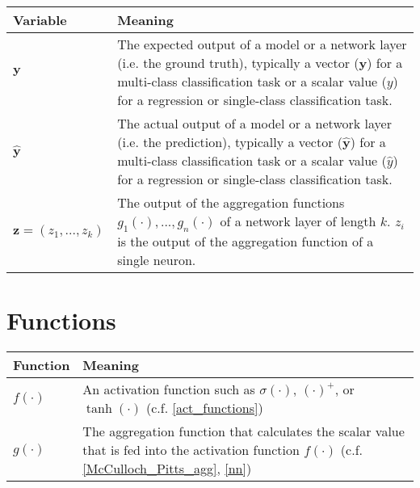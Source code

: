  \begin{tabular}{ p{3cm} p{11cm} }
	\textbf{Variable} & \textbf{Meaning}\\
	\hline
     $\boldsymbol{y}$ & The expected output of a model or a network layer (i.e. the ground truth), typically a vector ($\boldsymbol{y}$) for a multi-class classification task or a scalar value ($y$) for a regression or single-class classification task.\\
 	$\boldsymbol{\hat{y}}$ & The actual output of a model or a network layer (i.e. the prediction), typically a vector ($\boldsymbol{\hat{y}}$) for a multi-class classification task or a scalar value ($\hat{y}$) for a regression or single-class classification task.\\
	$\boldsymbol{z} = (z_1, ..., z_k)$ & The output of the aggregation functions $g_1(\cdot), ..., g_n(\cdot)$ of a network layer of length $k$. $z_i$  is the output of the aggregation function of a single neuron.\\
\end{tabular}


\section{Functions}

\begin{tabular}{ p{3cm} p{11cm} }
	\textbf{Function} & \textbf{Meaning}\\
	\hline
	$f(\cdot)$ & An activation function such as $\sigma(\cdot)$, $(\cdot)^{+}$, or $\tanh(\cdot)$ (c.f. \eqref{act_functions})\\
	$g(\cdot)$ & The aggregation function that calculates the scalar value that is fed into the activation function $f(\cdot)$ (c.f. \eqref{McCulloch_Pitts_agg},  \eqref{nn})\\
\end{tabular}
\renewcommand{\arraystretch}{1}






